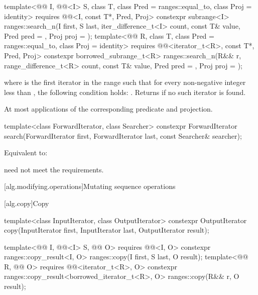 %
\begin{itemdecl}
template<@@ I, @@<I> S, class T,
         class Pred = ranges::equal_to, class Proj = identity>
  requires @@<I, const T*, Pred, Proj>
  constexpr subrange<I>
    ranges::search_n(I first, S last, iter_difference_t<I> count,
                     const T& value, Pred pred = {}, Proj proj = {});
template<@@ R, class T, class Pred = ranges::equal_to,
         class Proj = identity>
  requires @@<iterator_t<R>, const T*, Pred, Proj>
  constexpr borrowed_subrange_t<R>
    ranges::search_n(R&& r, range_difference_t<R> count,
                     const T& value, Pred pred = {}, Proj proj = {});
\end{itemdecl}

\begin{itemdescr}
\pnum
\returns
{}
where  is the first iterator in the range 
such that for every non-negative integer  less than ,
the following condition holds:
.
Returns  if no such iterator is found.

\pnum
\complexity
At most  applications
of the corresponding predicate and projection.
\end{itemdescr}

%
\begin{itemdecl}
template<class ForwardIterator, class Searcher>
  constexpr ForwardIterator
    search(ForwardIterator first, ForwardIterator last, const Searcher& searcher);
\end{itemdecl}

\begin{itemdescr}
\pnum
\effects
Equivalent to: 

\pnum
\remarks
{} need not meet the  requirements.
\end{itemdescr}

[alg.modifying.operations]{Mutating sequence operations}

[alg.copy]{Copy}

%
\begin{itemdecl}
template<class InputIterator, class OutputIterator>
  constexpr OutputIterator copy(InputIterator first, InputIterator last,
                                OutputIterator result);

template<@@ I, @@<I> S, @@ O>
  requires @@<I, O>
  constexpr ranges::copy_result<I, O> ranges::copy(I first, S last, O result);
template<@@ R, @@ O>
  requires @@<iterator_t<R>, O>
  constexpr ranges::copy_result<borrowed_iterator_t<R>, O> ranges::copy(R&& r, O result);
\end{itemdecl}

